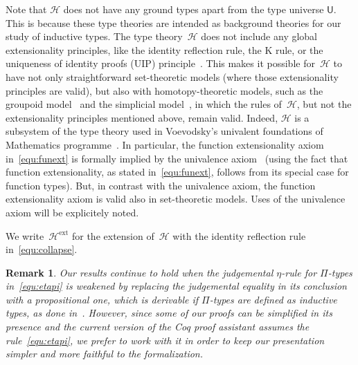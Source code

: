 \documentclass[10pt,a4paper,oneside,reqno]{amsart}
\numberwithin{equation}{section}
\theoremstyle{mythm}
\theoremstyle{mydef}
\theoremstyle{myrmk}
\newtheorem*{remark*}{Remark}
\newcommand{\Hint}{\mathcal{H}}
\newcommand{\Hext}{\mathcal{H}^{\mathrm{ext}}}
\newcommand{\U}{\mathsf{U}}
\begin{document}
\medskip

Note that $\Hint$ does not have any ground types apart from the type universe $\U$. This is because these type theories are intended as background
theories for our study of inductive types. The type theory~$\Hint$ 
does not include any global extensionality principles, like the identity reflection rule, the K rule, or 
the uniqueness of identity proofs (UIP) principle~\cite{StreicherT:invitt}. This makes it possible
for~$\Hint$ to have not only straightforward set-theoretic models (where those extensionality
principles are valid), but also with homotopy-theoretic models, such as the groupoid model~\cite{HofmannM:gromtt}
and the simplicial model~\cite{ssets}, in which the rules of~$\Hint$, but not the extensionality principles mentioned above, remain valid. Indeed, $\Hint$ is a subsystem of the type theory 
used in Voevodsky's univalent foundations of Mathematics programme~\cite{VoevodskyV:unifc}. 
In particular, the 
function extensionality axiom in~\eqref{equ:funext} is formally implied by the univalence axiom~\cite{VoevodskyV:notts} (using the fact that function extensionality, as stated in~\eqref{equ:funext}, follows from its special case for function types). But, in contrast with the univalence
axiom, the function extensionality axiom is valid also in set-theoretic models. Uses of the univalence axiom will be explicitely noted.

We write~$\Hext$ for the  extension of~$\Hint$ with the identity reflection rule in~\eqref{equ:collapse}.




\begin{remark*} Our results continue to hold when the judgemental $\eta$-rule for $\Pi$-types in~\eqref{equ:etapi}
is weakened by replacing the judgemental equality in its conclusion with a propositional one, which is
derivable if $\Pi$-types are defined as inductive types, as done in~\cite{NordstromB:promlt}. However, since
some of our proofs can be  simplified in its presence and the
current version of the Coq proof assistant assumes the rule~\eqref{equ:etapi}, 
we prefer to work with it in order to keep our presentation simpler and 
more faithful to the formalization.
\end{remark*}


 
\end{document}
